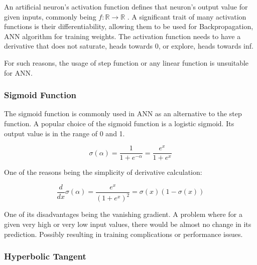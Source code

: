 An artificial neuron's activation function defines that neuron's output value
for given inputs, commonly being ${f: \mathbb{R} \rightarrow \mathbb{R}}$ \cite{leskovec2020mining}. A significant trait of many activation functions is their differentiability, allowing them to be used for Backpropagation, ANN algorithm for training weights. The activation function needs to have a derivative that does not saturate, heads towards 0, or explore, heads towards inf.

For such reasons, the usage of step function or any linear function is unsuitable for ANN.
\subsubsection{Sigmoid Function}
The sigmoid function is commonly used in ANN as an alternative to the step function. A popular choice of the sigmoid function is a logistic sigmoid. Its output value is in the range of 0 and 1.

\begin{equation}
    {\sigma(\alpha) = \frac{1}{1 + e^{-\alpha}} = \frac{e^x}{1 + e^{x}}}
\end{equation}




One of the reasons being the simplicity of derivative calculation:

\begin{equation}
    {\frac{d}{dx}\sigma(\alpha) = \frac{e^x}{(1 + e^{x})^2} = \sigma(x)(1-\sigma(x))}
\end{equation}


One of its disadvantages being the vanishing gradient. A problem where for a given very high or very low input values, there would be almost no change in its prediction. Possibly resulting in training complications or performance issues.\cite{7typesactivationfunctions}


\subsubsection{Hyperbolic Tangent}

